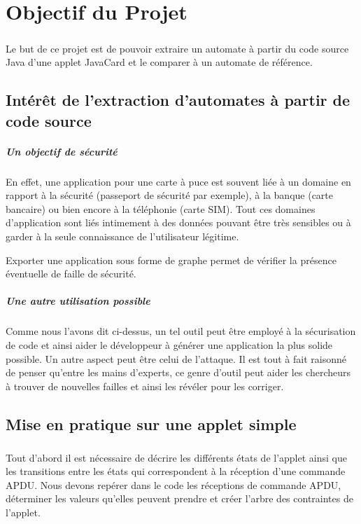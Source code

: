 \chapter{Objectif du Projet}
\paragraph{}
Le but de ce projet est de pouvoir extraire un automate à partir du code source Java d’une applet JavaCard et le comparer à un automate de référence.

\section{Intérêt de l'extraction d'automates à partir de code source}

\paragraph{Un objectif de sécurité}En effet, une application pour une carte à puce est souvent liée à un domaine en rapport à la sécurité (passeport de sécurité par exemple), à la banque (carte bancaire) ou bien encore à la téléphonie (carte SIM). Tout ces domaines d'application sont liés intimement à des données pouvant être très sensibles ou à garder à la seule connaissance de l'utilisateur légitime.

Exporter une application sous forme de graphe permet de vérifier la présence éventuelle de faille de sécurité.

\paragraph{Une autre utilisation possible}Comme nous l'avons dit ci-dessus, un tel outil peut être employé à la sécurisation de code et ainsi aider le développeur à générer une application la plus solide possible. Un autre aspect peut être celui de l'attaque. Il est tout à fait raisonné de penser qu'entre les mains d'experts, ce genre d'outil peut aider les chercheurs à trouver de nouvelles failles et ainsi les révéler pour les corriger.


\section{Mise en pratique sur une applet simple}

\paragraph{}
Tout d’abord il est nécessaire de décrire les différents états de l’applet ainsi que les transitions entre les états qui correspondent à la réception d’une commande \gls{APDU}. Nous devons repérer dans le code les réceptions de commande \gls{APDU}, déterminer les valeurs qu’elles peuvent prendre et créer l’arbre des contraintes de l’applet.
